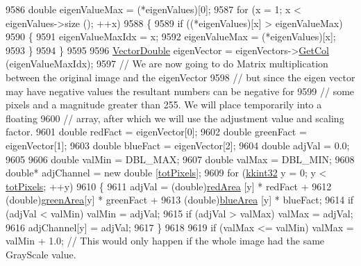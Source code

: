 \begin{DoxyCode}
9586   \textcolor{keywordtype}{double}  eigenValueMax    = (*eigenValues)[0];
9587   \textcolor{keywordflow}{for}  (x = 1;  x < eigenValues->size ();  ++x)
9588   \{
9589     \textcolor{keywordflow}{if}  ((*eigenValues)[x] > eigenValueMax)
9590     \{
9591       eigenValueMaxIdx = x;
9592       eigenValueMax = (*eigenValues)[x];
9593     \}
9594   \}
9595 
9596   \hyperlink{namespace_k_k_b_a5906c207479607e5f450434095914a41}{VectorDouble}  eigenVector = eigenVectors->\hyperlink{class_k_k_b_1_1_matrix_aa0e75f188938ed8b108999e432704c6f}{GetCol} (eigenValueMaxIdx);
9597   \textcolor{comment}{// We are now going to do Matrix multiplication between the original image and the eigenVector}
9598   \textcolor{comment}{// but since the eigen vector may have negative values the resultant numbers can be negative for}
9599   \textcolor{comment}{// some pixels and a magnitude greater than 255.  We will place temporarily into a floating }
9600   \textcolor{comment}{// array,  after which we will use the adjustment value and scaling factor.}
9601   \textcolor{keywordtype}{double}  redFact   = eigenVector[0];
9602   \textcolor{keywordtype}{double}  greenFact = eigenVector[1];
9603   \textcolor{keywordtype}{double}  blueFact  = eigenVector[2];
9604   \textcolor{keywordtype}{double}  adjVal    = 0.0;
9605 
9606   \textcolor{keywordtype}{double}  valMin = DBL\_MAX;
9607   \textcolor{keywordtype}{double}  valMax = DBL\_MIN;
9608   \textcolor{keywordtype}{double}*  adjChannel = \textcolor{keyword}{new} \textcolor{keywordtype}{double} [\hyperlink{class_k_k_b_1_1_raster_a9b08c4a0ca0a35435a478599635f1dc0}{totPixels}];
9609   \textcolor{keywordflow}{for}  (\hyperlink{namespace_k_k_b_a8fa4952cc84fda1de4bec1fbdd8d5b1b}{kkint32} y = 0;  y < \hyperlink{class_k_k_b_1_1_raster_a9b08c4a0ca0a35435a478599635f1dc0}{totPixels};  ++y)
9610   \{
9611     adjVal = (double)\hyperlink{class_k_k_b_1_1_raster_aaef16f7d4dc7c8b99e84176d0babd731}{redArea}  [y] * redFact    +
9612              (\textcolor{keywordtype}{double})\hyperlink{class_k_k_b_1_1_raster_ad981258f1f7284a8bd0cd0466f328cdf}{greenArea}[y] * greenFact  +
9613              (double)\hyperlink{class_k_k_b_1_1_raster_af7996dfe61613e5ecf91454175bfe3f1}{blueArea} [y] * blueFact;
9614     \textcolor{keywordflow}{if}  (adjVal < valMin)  valMin = adjVal;
9615     \textcolor{keywordflow}{if}  (adjVal > valMax)  valMax = adjVal;
9616     adjChannel[y] = adjVal;
9617   \}
9618 
9619   \textcolor{keywordflow}{if}  (valMax <= valMin)  valMax = valMin + 1.0;   \textcolor{comment}{// This would only happen if the whole image had the
       same GrayScale value.}

\end{DoxyCode}
